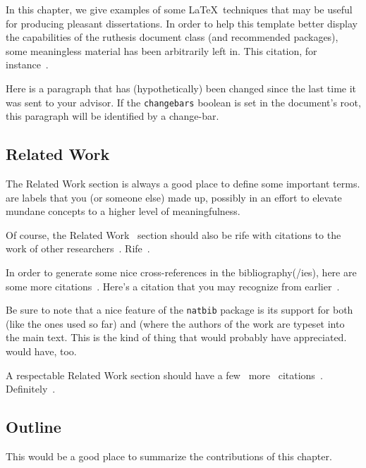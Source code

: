 In this chapter, we give examples of some \LaTeX\ techniques that may be useful for producing pleasant dissertations.
In order to help this template better display the capabilities of the ruthesis document class (and recommended packages), some meaningless material has been arbitrarily left in.
This citation, for instance~\citep{Johansson:1996:HANDBRAIN}.

\cbstart%
Here is a paragraph that has (hypothetically) been changed since the last time it was sent to your advisor.
If the \texttt{changebars} boolean is set in the document's root, this paragraph will be identified by a change-bar.
\cbend%

\subsection{Related Work}%
\label{sec:ut:introduction:relatedWork}%
The Related Work section is always a good place to define some important terms.
 are labels that you (or someone else) made up, possibly in an effort to elevate mundane concepts to a higher level of meaningfulness.

Of course, the Related Work~\citep{Robles:2001:Nature} section should also be rife with citations to the work of other researchers~\citep{Lloyd:2001:ICRA,Lederman:2004:HANDBOOK}.
Rife~\citep{Srinivasan:1996:ASME}.

In order to generate some nice cross-references in the bibliography(/ies), here are some more citations~\citep{Stein:1993:MergingOfSenses,HandbookOfMultisensory04}.
Here's a citation that you may recognize from earlier~\citep{Johansson:1996:HANDBRAIN}.

Be sure to note that a nice feature of the \texttt{natbib} package is its support for both  (like the ones used so far) and  (where the authors of the work are typeset into the main text.
This is the kind of thing that \citet{Salcudean:1997:ASME} would probably have appreciated.
\citet{Hwang:2004:HAPSYMP} would have, too.

A respectable Related Work section should have a few~\citep{Hwang:2004:HAPSYMP} more~\citep{Kuchenbecker:2006:TVCG,Okamura:2001:ASME} citations~\citep{Lintern:1991:HUMANFACTORS}.
Definitely~\citep{Mertens:1981:AVIATIONSPACEENVMED, Wightman:1985:HUMANFACTORS}.

\subsection{Outline}%
This would be a good place to summarize the contributions of this chapter.

